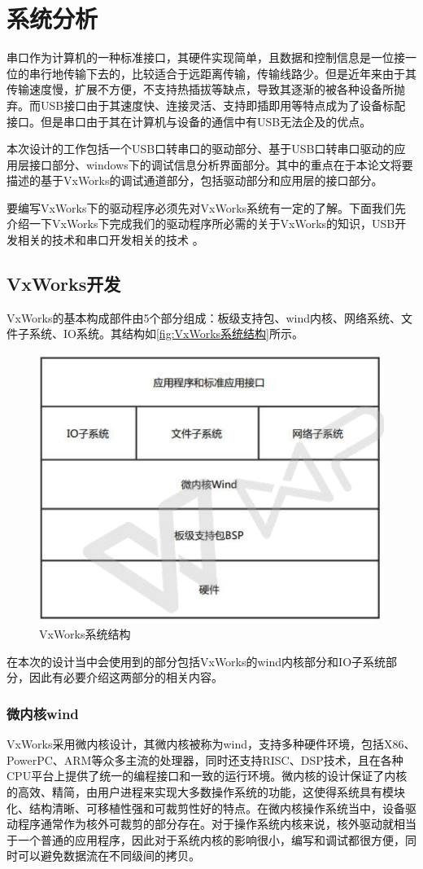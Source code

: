 \chapter{系统分析}
	
	串口作为计算机的一种标准接口，其硬件实现简单，且数据和控制信息是一位接一位的串行地传输下去的，比较适合于远距离传输，传输线路少。但是近年来由于其传输速度慢，扩展不方便，不支持热插拔等缺点，导致其逐渐的被各种设备所抛弃。而USB接口由于其速度快、连接灵活、支持即插即用等特点成为了设备标配接口。但是串口由于其在计算机与设备的通信中有USB无法企及的优点。
	
	本次设计的工作包括一个USB口转串口的驱动部分、基于USB口转串口驱动的应用层接口部分、windows下的调试信息分析界面部分。其中的重点在于本论文将要描述的基于VxWorks的调试通道部分，包括驱动部分和应用层的接口部分。
	
	要编写VxWorks下的驱动程序必须先对VxWorks系统有一定的了解。下面我们先介绍一下VxWorks下完成我们的驱动程序所必需的关于VxWorks的知识，USB开发相关的技术和串口开发相关的技术 。

\section{VxWorks开发}
	VxWorks的基本构成部件由5个部分组成：板级支持包、wind内核、网络系统、文件子系统、IO系统。其结构如\autoref{fig:VxWorks系统结构}所示。
\begin{figure}[!h]
\centering
\includegraphics[width=.7\textwidth]{./graphics/VxWorks-sys-structure.pdf}
\caption{VxWorks系统结构}\label{fig:VxWorks系统结构}
\end{figure}

在本次的设计当中会使用到的部分包括VxWorks的wind内核部分和IO子系统部分，因此有必要介绍这两部分的相关内容。
	
\subsection{微内核wind}
	VxWorks采用微内核设计，其微内核被称为wind，支持多种硬件环境，包括X86、PowerPC、ARM等众多主流的处理器，同时还支持RISC、DSP技术，且在各种CPU平台上提供了统一的编程接口和一致的运行环境。微内核的设计保证了内核的高效、精简，由用户进程来实现大多数操作系统的功能，这使得系统具有模块化、结构清晰、可移植性强和可裁剪性好的特点。在微内核操作系统当中，设备驱动程序通常作为核外可裁剪的部分存在。对于操作系统内核来说，核外驱动就相当于一个普通的应用程序，因此对于系统内核的影响很小，编写和调试都很方便，同时可以避免数据流在不同级间的拷贝。
		
